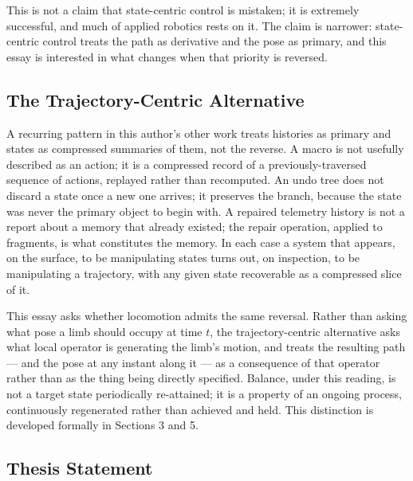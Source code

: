 \documentclass[12pt]{article}
\begin{document}
This is not a claim that state-centric control is mistaken; it is extremely successful, and much of applied robotics rests on it. The claim is narrower: state-centric control treats the path as derivative and the pose as primary, and this essay is interested in what changes when that priority is reversed.

\subsection{The Trajectory-Centric Alternative}

A recurring pattern in this author's other work treats histories as primary and states as compressed summaries of them, not the reverse. A macro is not usefully described as an action; it is a compressed record of a previously-traversed sequence of actions, replayed rather than recomputed. An undo tree does not discard a state once a new one arrives; it preserves the branch, because the state was never the primary object to begin with. A repaired telemetry history is not a report about a memory that already existed; the repair operation, applied to fragments, is what constitutes the memory. In each case a system that appears, on the surface, to be manipulating states turns out, on inspection, to be manipulating a trajectory, with any given state recoverable as a compressed slice of it.

This essay asks whether locomotion admits the same reversal. Rather than asking what pose a limb should occupy at time $t$, the trajectory-centric alternative asks what local operator is generating the limb's motion, and treats the resulting path — and the pose at any instant along it — as a consequence of that operator rather than as the thing being directly specified. Balance, under this reading, is not a target state periodically re-attained; it is a property of an ongoing process, continuously regenerated rather than achieved and held. This distinction is developed formally in Sections 3 and 5.

\subsection{Thesis Statement}
\end{document}
